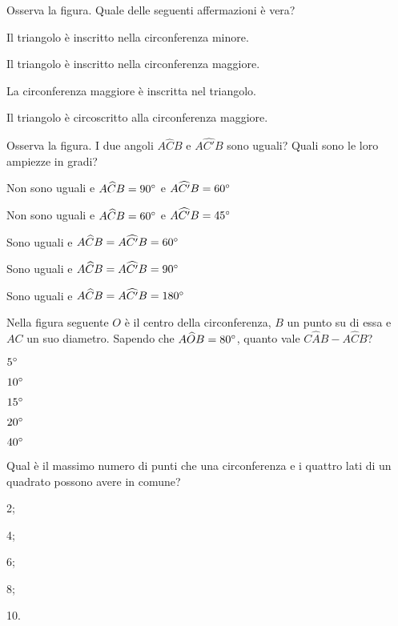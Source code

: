 \begin{esercizio}
\label{ese:5.60}
Osserva la figura. Quale delle seguenti affermazioni è vera?
\begin{enumeratea}
\item Il triangolo è inscritto nella circonferenza minore.
\item Il triangolo è inscritto nella circonferenza maggiore.
\item La circonferenza maggiore è inscritta nel triangolo.
\item Il triangolo è circoscritto alla circonferenza maggiore.
\end{enumeratea}
\end{esercizio}

\begin{esercizio}
\label{ese:5.61}
Osserva la figura. I due angoli $A\widehat{C}B$ e $A\widehat{C'}B$ sono uguali? Quali sono le loro ampiezze in gradi?
\begin{enumeratea}
\item Non sono uguali e $A\widehat{C}B=90{}^{\circ}$ e $A\widehat{C'}B=60{}^{\circ}$
\item Non sono uguali e $A\widehat{C}B=60{}^{\circ}$ e $A\widehat{C'}B=45{}^{\circ}$
\item Sono uguali e $A\widehat{C}B=A\widehat{C'}B=60{}^{\circ}$
\item Sono uguali e $A\widehat{C}B=A\widehat{C'}B=90{}^{\circ}$
\item Sono uguali e $A\widehat{C}B=A\widehat{C'}B=180{}^{\circ}$
\end{enumeratea}
\end{esercizio}

\begin{esercizio}
\label{ese:5.62}
Nella figura seguente $O$ è il centro della circonferenza, $B$ un punto su di essa e $AC$ un suo diametro. Sapendo che $A\widehat{O}B=80{}^{\circ}$, quanto vale $C\widehat{A}B-A\widehat{C}B$?
\begin{enumeratea}
\item $5{}^{\circ}$
\item $10{}^{\circ}$
\item $15{}^{\circ}$
\item $20{}^{\circ}$
\item $40{}^{\circ}$
\end{enumeratea}
\end{esercizio}

\begin{esercizio}
\label{ese:5.63}
Qual è il massimo numero di punti che una circonferenza e i quattro lati di un quadrato possono avere in comune?
\begin{multicols}{5}
\begin{enumeratea}
\item 2;
\item 4;
\item 6;
\item 8;
\item 10.
\end{enumeratea}
\end{multicols}
\end{esercizio}

